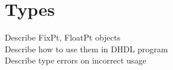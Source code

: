 \section{Types}
Describe FixPt, FloatPt objects \\
Describe how to use them in DHDL program \\
Describe type errors on incorrect usage
